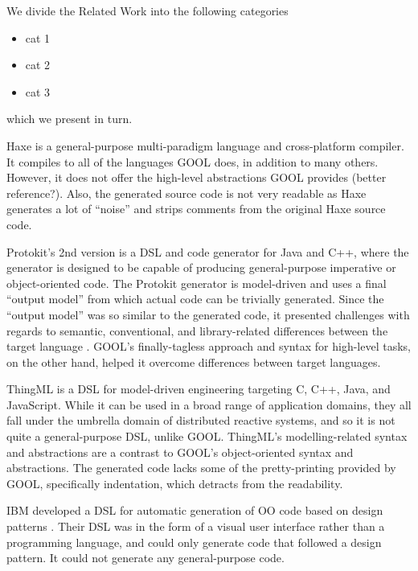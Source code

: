 \documentclass[sigplan,review,anonymous]{acmart}
\begin{document}
We divide the Related Work into the following categories
\begin{itemize}
\item cat 1
\item cat 2
\item cat 3
\end{itemize}
which we present in turn.

Haxe is a general-purpose multi-paradigm language and cross-platform compiler. 
It compiles to all of the languages GOOL does, in addition to many others. 
However, it does not offer the high-level abstractions GOOL provides 
\cite{Haxe} (better reference?). Also, the generated source code is not very 
readable as Haxe generates a lot of ``noise'' and strips comments from the 
original Haxe source code.

Protokit's 2nd version is a DSL and code generator for Java and C++, where the 
generator is designed to be capable of producing general-purpose imperative or 
object-oriented code. The Protokit generator is model-driven and uses a final 
``output model'' from which actual code can be trivially generated. Since the 
``output model'' was so similar to the generated code, it presented challenges 
with regards to semantic, conventional, and library-related differences between 
the target language \cite{kovesdan2017multi}. GOOL's finally-tagless approach 
and syntax for high-level tasks, on the other hand, helped it overcome 
differences between target languages.

ThingML \cite{harrand2016thingml} is a DSL for model-driven engineering 
targeting C, C++, Java, and 
JavaScript. While it can be used in a broad range of application domains, they 
all fall under the umbrella domain of distributed reactive systems, and so it 
is not quite a general-purpose DSL, unlike GOOL. ThingML's modelling-related 
syntax and abstractions are a contrast to GOOL's object-oriented syntax and 
abstractions. The generated code lacks some of the pretty-printing provided by 
GOOL, specifically indentation, which detracts from the readability.

IBM developed a DSL for automatic generation of OO code based on design 
patterns \cite{budinsky1996automatic}. Their DSL was in the form of a visual 
user interface rather than a programming language, and could only generate code 
that followed a design pattern. It could not generate any general-purpose code.
\end{document}
